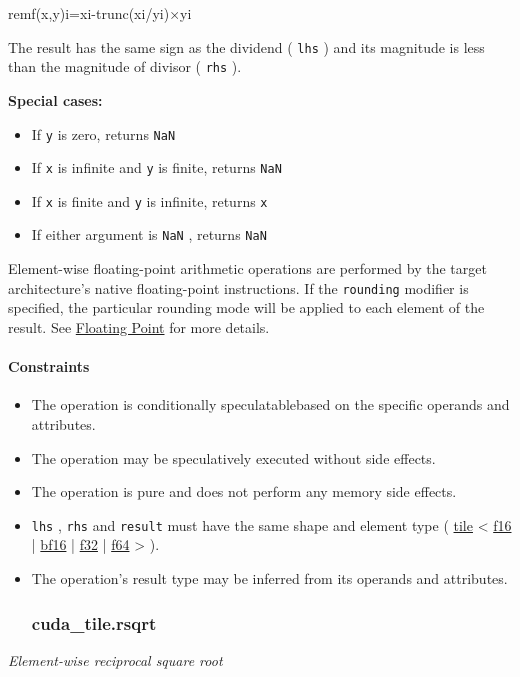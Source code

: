 \documentclass{article}
\begin{document}
remf(x,y)i=xi-trunc(xi/yi)×yi

The result has the same sign as the dividend ( \texttt{lhs} ) and its magnitude is less than the magnitude of divisor ( \texttt{rhs} ).


\textbf{Special cases:}


\begin{itemize}
\item If \texttt{y} is zero, returns \texttt{NaN}
\item If \texttt{x} is infinite and \texttt{y} is finite, returns \texttt{NaN}
\item If \texttt{x} is finite and \texttt{y} is infinite, returns \texttt{x}
\item If either argument is \texttt{NaN} , returns \texttt{NaN}

\end{itemize}
Element-wise floating-point arithmetic operations are performed by the target architecture's native floating-point instructions. If the \texttt{rounding} modifier is specified, the particular rounding mode will be applied to each element of the result. See \href{https://docs.nvidia.com/cuda/tile-ir/latest/sections/operations.html#op-group-floating-point}{Floating Point} for more details.



\paragraph{Constraints}

\begin{itemize}
\item The operation is conditionally speculatablebased on the specific operands and attributes.
\item The operation may be speculatively executed without side effects.
\item The operation is pure and does not perform any memory side effects.
\item \texttt{lhs} , \texttt{rhs} and \texttt{result} must have the same shape and element type ( \href{https://docs.nvidia.com/cuda/tile-ir/latest/sections/types.html#type-tile}{tile} < \href{https://docs.nvidia.com/cuda/tile-ir/latest/sections/types.html#subsection-element-types}{f16} | \href{https://docs.nvidia.com/cuda/tile-ir/latest/sections/types.html#subsection-element-types}{bf16} | \href{https://docs.nvidia.com/cuda/tile-ir/latest/sections/types.html#subsection-element-types}{f32} | \href{https://docs.nvidia.com/cuda/tile-ir/latest/sections/types.html#subsection-element-types}{f64} > ).
\item The operation's result type may be inferred from its operands and attributes.


\subsubsection{cuda\_tile.rsqrt}

\end{itemize}
\textit{Element-wise reciprocal square root}
\end{document}
